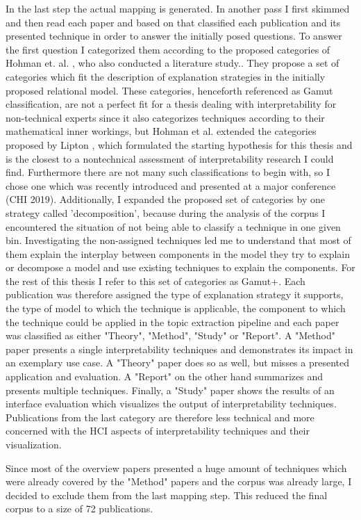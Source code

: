 \begin{enumerate}
	In the last step the actual mapping is generated. In another pass I first skimmed and then read each paper and based on that classified each publication and its presented technique in order to answer the initially posed questions. To answer the first question I categorized them according to the proposed categories of Hohman et. al. \cite{hohmanGamutDesignProbe2019}, who also conducted a literature study.. 
	They propose a set of categories which fit the description of explanation strategies in the initially proposed relational model. These categories, henceforth referenced as Gamut classification, are not a perfect fit for a thesis dealing with interpretability for non-technical experts since it also categorizes techniques according to their mathematical inner workings, but Hohman et al. extended the categories proposed by Lipton \cite{liptonMythosModelInterpretability2016a}, which formulated the starting hypothesis for this thesis and is the closest to a nontechnical assessment of interpretability research I could find. Furthermore there are not many such classifications to begin with, so I chose one which was recently introduced and presented at a major conference (CHI 2019).  
	Additionally, I expanded the proposed set of categories by one strategy called 'decomposition', because during the analysis of the corpus I encountered the situation of not being able to classify a technique in one given bin. Investigating the non-assigned techniques led me to understand that most of them explain the interplay between components in the model they try to explain or decompose a model and use existing techniques to explain the components. For the rest of this thesis I refer to this set of categories as Gamut+.
	Each publication was therefore assigned the type of explanation strategy it supports, the type of model to which the technique is applicable, the component to which the technique could be applied in the topic extraction pipeline and each paper was classified as either "Theory", "Method", "Study" or "Report". 
	A "Method" paper presents a single interpretability techniques and demonstrates its impact in an exemplary use case. A "Theory" paper does so as well, but misses a presented application and evaluation. A "Report" on the other hand summarizes and presents multiple techniques. Finally, a "Study" paper shows the results of an interface evaluation which visualizes the output of interpretability techniques. Publications from the last category are therefore less technical and more concerned with the HCI aspects of interpretability techniques and their visualization.
	
	Since most of the overview papers presented a huge amount of techniques which were already covered by the "Method" papers and the corpus was already large, I decided to exclude them from the last mapping step. This reduced the final corpus to a size of 72 publications.

\end{enumerate}

